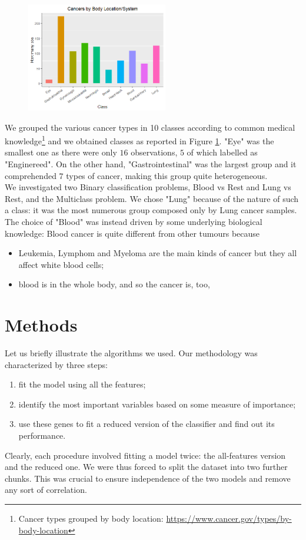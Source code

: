 \documentclass[a4paper,11pt, oneside]{article}  %
\begin{document}
	\begin{figure}
		\includegraphics[width=0.55\textwidth]{plot1.png}
		\label{fig1}
	\end{figure}
	We grouped the various cancer types in 10 classes according to common medical knowledge\footnote{Cancer types grouped by body location: \url{https://www.cancer.gov/types/by-body-location}} and we obtained classes as reported in Figure \ref{fig1}.  "Eye" was the smallest one as there were only $16$ observations, $5$ of which labelled as "Enginereed". On the other hand, "Gastrointestinal" was the largest group and it comprehended $7$ types of cancer,  making this group quite heterogeneous. \\
	We investigated two Binary classification problems, Blood vs Rest and Lung vs Rest, and the Multiclass problem. We chose "Lung" because of the nature of such a class: it was the most numerous group composed only by Lung cancer samples. The choice of "Blood" was instead driven by some underlying biological knowledge: Blood cancer is quite different from other tumours because
	\begin{itemize}
		\item Leukemia, Lymphom and Myeloma are the main kinds of cancer but they all affect white blood cells;
		\item blood is in the whole body, and so the cancer is, too,	
	\end{itemize} 
	
	\section{Methods}
	Let us briefly illustrate the algorithms we used. Our methodology was characterized by three steps:
	\begin{enumerate}
		\item fit the model using all the features;
		\item identify the most important variables based on some measure of importance;
		\item use these genes to fit a reduced version of the classifier and find out its performance.
	\end{enumerate}
	Clearly, each procedure involved fitting a model twice: the all-features version and the reduced one. We were thus forced to split the dataset into two further chunks. This was crucial to ensure independence of the two models and remove any sort of correlation.
	
\end{document}
